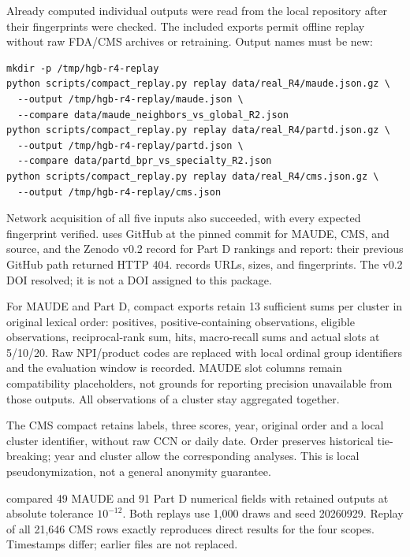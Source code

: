 Already computed individual outputs were read from the local repository after their fingerprints were checked. The included exports permit offline replay without raw FDA/CMS archives or retraining. Output names must be new:

\begin{Verbatim}[fontsize=\footnotesize]
mkdir -p /tmp/hgb-r4-replay
python scripts/compact_replay.py replay data/real_R4/maude.json.gz \
  --output /tmp/hgb-r4-replay/maude.json \
  --compare data/maude_neighbors_vs_global_R2.json
python scripts/compact_replay.py replay data/real_R4/partd.json.gz \
  --output /tmp/hgb-r4-replay/partd.json \
  --compare data/partd_bpr_vs_specialty_R2.json
python scripts/compact_replay.py replay data/real_R4/cms.json.gz \
  --output /tmp/hgb-r4-replay/cms.json
\end{Verbatim}

Network acquisition of all five inputs also succeeded, with every expected fingerprint verified.  uses GitHub at the pinned commit for MAUDE, CMS, and source, and the Zenodo v0.2 record for Part D rankings and report: their previous GitHub path returned HTTP 404.  records URLs, sizes, and fingerprints. The v0.2 DOI resolved; it is not a DOI assigned to this package.

For MAUDE and Part D, compact exports retain 13 sufficient sums per cluster in original lexical order: positives, positive-containing observations, eligible observations, reciprocal-rank sum, hits, macro-recall sums and actual slots at 5/10/20. Raw NPI/product codes are replaced with local ordinal group identifiers and the evaluation window is recorded. MAUDE slot columns remain compatibility placeholders, not grounds for reporting precision unavailable from those outputs. All observations of a cluster stay aggregated together.

The CMS compact retains labels, three scores, year, original order and a local cluster identifier, without raw CCN or daily date. Order preserves historical tie-breaking; year and cluster allow the corresponding analyses. This is local pseudonymization, not a general anonymity guarantee.

 compared 49 MAUDE and 91 Part D numerical fields with retained outputs at absolute tolerance $10^{-12}$. Both replays use 1,000 draws and seed 20260929. Replay of all 21,646 CMS rows exactly reproduces direct results for the four scopes. Timestamps differ; earlier files are not replaced.

